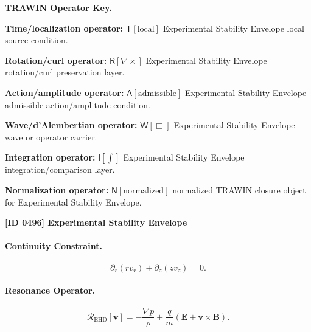 \par\vspace{0.45\baselineskip}
\noindent\begin{minipage}[t]{\linewidth}
\begingroup
\small
\raggedright
\textbf{TRAWIN Operator Key.}\par
\noindent\textbf{Time/localization operator:} $\mathsf{T}\!\left[\mathrm{local}\right]$ Experimental Stability Envelope local source condition.\par
\noindent\textbf{Rotation/curl operator:} $\mathsf{R}\!\left[\nabla\times\right]$ Experimental Stability Envelope rotation/curl preservation layer.\par
\noindent\textbf{Action/amplitude operator:} $\mathsf{A}\!\left[\mathrm{admissible}\right]$ Experimental Stability Envelope admissible action/amplitude condition.\par
\noindent\textbf{Wave/d'Alembertian operator:} $\mathsf{W}\!\left[\Box\right]$ Experimental Stability Envelope wave or operator carrier.\par
\noindent\textbf{Integration operator:} $\mathsf{I}\!\left[\int\right]$ Experimental Stability Envelope integration/comparison layer.\par
\noindent\textbf{Normalization operator:} $\mathsf{N}\!\left[\mathrm{normalized}\right]$ normalized TRAWIN closure object for Experimental Stability Envelope.\par
\endgroup
\end{minipage}

\clearpage
\noindent\textbf{[ID 0496] Experimental Stability Envelope}\par
\vspace{0.35em}
\begingroup\small
\paragraph{Continuity Constraint.}
\begin{equation}
\partial_r(rv_r)+\partial_z(zv_z)=0.
\end{equation}

\paragraph{Resonance Operator.}
\begin{equation}
\mathcal{R}_{\mathrm{EHD}}[\mathbf{v}]
=
-\frac{\nabla p}{\rho}
+
\frac{q}{m}
(\mathbf{E}+\mathbf{v}\times\mathbf{B}).
\end{equation}

